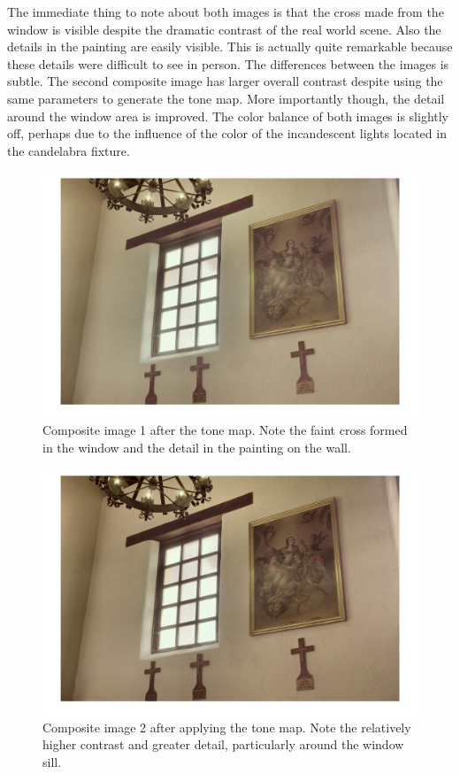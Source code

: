 \documentclass[a4paper]{article}
\begin{document}
The immediate thing to note about both images is that the cross made from the window is  visible despite the dramatic contrast of the real world scene.  Also the details in the painting are easily visible. This is actually quite remarkable because these details were difficult to see in person.  The differences between the images is subtle.  The second composite image has larger overall contrast despite using the same parameters to generate the tone map.  More importantly though, the detail around the window area is improved.  The color balance of both images is slightly off, perhaps due to the influence of the color of the incandescent lights located in the candelabra fixture.  
\begin{figure}[htb!]
    \begin{center}
        \includegraphics[width=6 in]{comp1LDR.jpg}
	 \end{center}
    \caption{Composite image 1 after the tone map.  Note the faint cross formed in the window and the detail in the painting on the wall.} 
    \label{fig:LDR1}
\end{figure}

\begin{figure}[htb!]
    \begin{center}
        \includegraphics[width=6 in]{comp2LDR.jpg}
	 \end{center}
    \caption{Composite image 2 after applying the tone map.  Note the relatively higher contrast and greater detail, particularly around the window sill.} 
    \label{fig:LDR2}
\end{figure}
\FloatBarrier
\end{document}
